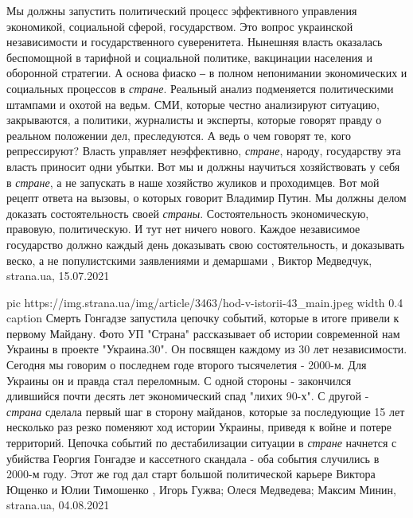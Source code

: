 Мы должны запустить политический процесс эффективного управления экономикой,
социальной сферой, государством. Это вопрос украинской независимости и
государственного суверенитета. Нынешняя власть оказалась беспомощной в тарифной
и социальной политике, вакцинации населения и оборонной стратегии. А основа
фиаско ‒ в полном непонимании экономических и социальных процессов в \emph{стране}.
Реальный анализ подменяется политическими штампами и охотой на ведьм.  СМИ,
которые честно анализируют ситуацию, закрываются, а политики, журналисты и
эксперты, которые говорят правду о реальном положении дел, преследуются. А ведь
о чем говорят те, кого репрессируют? Власть управляет неэффективно, \emph{стране},
народу, государству эта власть приносит одни убытки.  Вот мы и должны научиться
хозяйствовать у себя в \emph{стране}, а не запускать в наше хозяйство жуликов и
проходимцев.  Вот мой рецепт ответа на вызовы, о которых говорит Владимир
Путин. Мы должны делом доказать состоятельность своей \emph{страны}. Состоятельность
экономическую, правовую, политическую. И тут нет ничего нового. Каждое
независимое государство должно каждый день доказывать свою состоятельность, и
доказывать веско, а не популистскими заявлениями и демаршами
, 
Виктор Медведчук, strana.ua, 15.07.2021

\ifcmt
  pic https://img.strana.ua/img/article/3463/hod-v-istorii-43_main.jpeg
  width 0.4
	caption Смерть Гонгадзе запустила цепочку событий, которые в итоге привели к первому Майдану. Фото УП 
\fi
"Страна" рассказывает об истории современной нам Украины в проекте
"Украина.30". Он посвящен каждому из 30 лет независимости.  Сегодня мы говорим
о последнем годе второго тысячелетия - 2000-м.  Для Украины он и правда стал
переломным.  С одной стороны - закончился длившийся почти десять лет
экономический спад "лихих 90-х".  С другой - \emph{страна} сделала первый шаг в
сторону майданов, которые за последующие 15 лет несколько раз резко поменяют
ход истории Украины, приведя к войне и потере территорий.  Цепочка событий по
дестабилизации ситуации в \emph{стране} начнется с убийства Георгия Гонгадзе и
кассетного скандала - оба события случились в 2000-м году. Этот  же год дал
старт большой политической карьере Виктора Ющенко и Юлии Тимошенко
, 
Игорь Гужва; Олеся Медведева; Максим Минин, strana.ua, 04.08.2021

